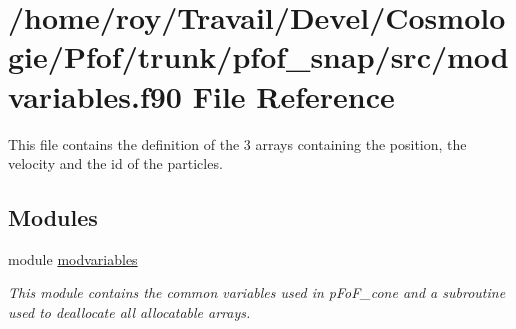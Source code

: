 \hypertarget{pfof__snap_2src_2modvariables_8f90}{}\section{/home/roy/\+Travail/\+Devel/\+Cosmologie/\+Pfof/trunk/pfof\+\_\+snap/src/modvariables.f90 File Reference}
\label{pfof__snap_2src_2modvariables_8f90}


This file contains the definition of the 3 arrays containing the position, the velocity and the id of the particles.  


\subsection*{Modules}
\begin{DoxyCompactItemize}
\item 
module \hyperlink{namespacemodvariables}{modvariables}
\begin{DoxyCompactList}\small\item\em This module contains the common variables used in p\+Fo\+F\+\_\+cone and a subroutine used to deallocate all allocatable arrays. \end{DoxyCompactList}\end{DoxyCompactItemize}
